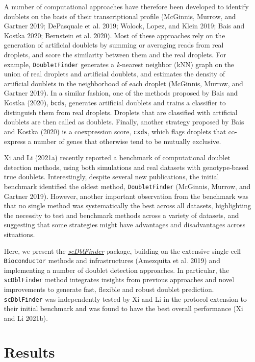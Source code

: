 \documentclass[10pt,a4paper,twocolumn]{article}
\begin{document}
A number of computational approaches have therefore been developed to identify doublets on the basis of their transcriptional profile (McGinnis, Murrow, and Gartner 2019; DePasquale et al. 2019; Wolock, Lopez, and Klein 2019; Bais and Kostka 2020; Bernstein et al. 2020).
Most of these approaches rely on the generation of artificial doublets by summing or averaging reads from real droplets, and score the similarity between them and the real droplets.
For example, \texttt{DoubletFinder} generates a \emph{k}-nearest neighbor (kNN) graph on the union of real droplets and artificial doublets, and estimates the density of artificial doublets in the neighborhood of each droplet (McGinnis, Murrow, and Gartner 2019).
In a similar fashion, one of the methods proposed by Bais and Kostka (2020), \texttt{bcds}, generates artificial doublets and trains a classifier to distinguish them from real droplets.
Droplets that are classified with artificial doublets are then called as doublets.
Finally, another strategy proposed by Bais and Kostka (2020) is a coexpression score, \texttt{cxds}, which flags droplets that co-express a number of genes that otherwise tend to be mutually exclusive.

Xi and Li (2021a) recently reported a benchmark of computational doublet detection methods, using both simulations and real datasets with genotype-based true doublets.
Interestingly, despite several new publications, the initial benchmark identified the oldest method, \texttt{DoubletFinder} (McGinnis, Murrow, and Gartner 2019).
However, another important observation from the benchmark was that no single method was systematically the best across all datasets, highlighting the necessity to test and benchmark methods across a variety of datasets, and suggesting that some strategies might have advantages and disadvantages across situations.

Here, we present the \emph{\href{https://bioconductor.org/packages/3.13/scDblFinder}{scDblFinder}} package, building on the extensive single-cell \texttt{Bioconductor} methods and infrastructures (Amezquita et al. 2019) and implementing a number of doublet detection approaches.
In particular, the \texttt{scDblFinder} method integrates insights from previous approaches and novel improvements to generate fast, flexible and robust doublet prediction. \texttt{scDblFinder} was independently tested by Xi and Li in the protocol extension to their initial benchmark and was found to have the best overall performance (Xi and Li 2021b).


\section*{Results}
\end{document}
